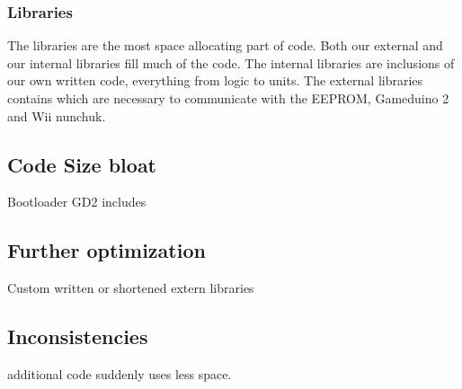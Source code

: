 \subsubsection{Libraries}
The libraries are the most space allocating part of code. Both our external and
our internal libraries fill much of the code. The internal libraries are
inclusions of our own written code, everything from logic to units. The external
libraries contains which are necessary to communicate with the EEPROM,
Gameduino 2 and Wii nunchuk.

\subsection{Code Size bloat} Bootloader GD2 includes \subsection{Further
optimization} Custom written or shortened extern libraries

\subsection{Inconsistencies} %
additional code suddenly uses less space.